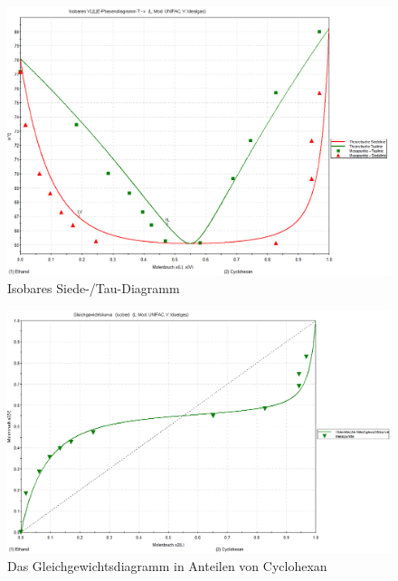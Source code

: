\begin{figure}[h!]
	\centering
	\includegraphics[width=1.1\linewidth]{img/VLE-T-x-isobar}
	\caption{Isobares Siede-/Tau-Diagramm}
	\label{fig:T-x2-isobar}
\end{figure}

\begin{figure}[h!]
	\centering
	\includegraphics[width=1.1\linewidth]{img/gleichgewichtsdiagramm}
	\caption{Das Gleichgewichtsdiagramm in Anteilen von Cyclohexan}
	\label{fig:gleichgewichtsdiagramm}
\end{figure}


